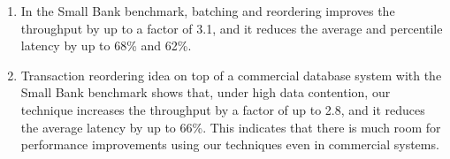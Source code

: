 \begin{enumerate}[leftmargin=*]
\item In the Small Bank benchmark, batching and reordering improves the throughput by up to a factor of 3.1, and it reduces the average and percentile latency by up to 68\% and 62\%.
\item Transaction reordering idea on top of a commercial database system with the Small Bank benchmark shows that, under high data contention, our technique increases the throughput by a factor of up to 2.8, and it reduces the average latency by up to 66\%. This indicates that there is much room for performance improvements using our techniques even in commercial systems.
\end{enumerate}  
